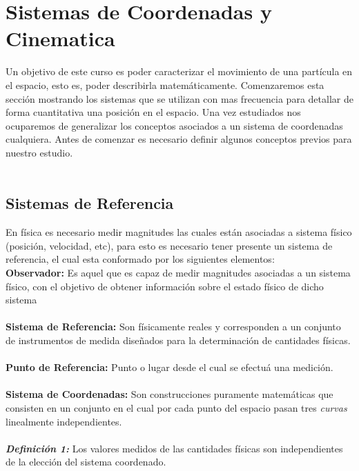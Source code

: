 \documentclass[12pt]{report}
\begin{document}
\chapter{Sistemas de Coordenadas y Cinematica}\label{chapter2}

Un objetivo de este curso es poder caracterizar el movimiento de una partícula en el espacio, esto es, poder describirla matemáticamente. Comenzaremos esta sección mostrando los sistemas que se utilizan con mas frecuencia para detallar de forma cuantitativa una posición en el espacio. Una vez estudiados nos ocuparemos de generalizar los conceptos asociados a un sistema de coordenadas cualquiera. Antes de comenzar es necesario definir algunos conceptos previos para nuestro estudio. \\
\\


\section{Sistemas de Referencia}

En física es necesario medir magnitudes las cuales están asociadas a sistema físico (posición, velocidad, etc), para esto es necesario tener presente un sistema de referencia, el cual esta conformado por los siguientes elementos: \\


\textbf{Observador:} 
Es aquel que es capaz de medir magnitudes asociadas a un sistema físico, con el objetivo de obtener información sobre el estado físico de dicho sistema \\
\\

\textbf{Sistema de Referencia:} Son físicamente reales y corresponden a un conjunto de instrumentos de medida diseñados para la determinación de cantidades físicas. \\
\\

\textbf{Punto de Referencia:} Punto o lugar desde el cual se efectuá una medición. \\
\\

\textbf{Sistema de Coordenadas:} Son construcciones puramente matemáticas que consisten en un conjunto en el cual por cada punto del espacio pasan tres \textit{curvas} linealmente independientes.  \\
\\


\textbf{\textit{Definición 1:}} Los valores medidos de las cantidades físicas son independientes de la elección del sistema coordenado. \\
\\
\end{document}
